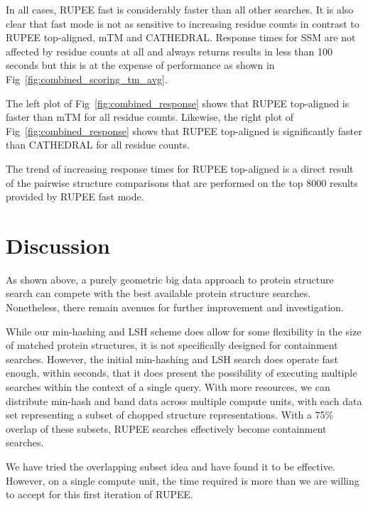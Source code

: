 \documentclass[10pt,letterpaper]{article}
\renewcommand{\figurename}{Fig}
\begin{document}
In all cases, RUPEE fast is considerably faster than all other searches. 
It is also clear that fast mode is not as sensitive to increasing residue counts in contrast to RUPEE top-aligned, mTM and CATHEDRAL.
Response times for SSM are not affected by residue counts at all and always returns results in less than 100 seconds but this is at the expense of performance as shown in \figurename~\ref{fig:combined_scoring_tm_avg}.

The left plot of \figurename~\ref{fig:combined_response} shows that RUPEE top-aligned is faster than mTM for all residue counts. 
Likewise, the right plot of \figurename~\ref{fig:combined_response} shows that RUPEE top-aligned is significantly faster than CATHEDRAL for all residue counts. 

The trend of increasing response times for RUPEE top-aligned is a direct result of the pairwise structure comparisons that are performed on the top 8000 results provided by RUPEE fast mode.

\section*{Discussion}

As shown above, a purely geometric big data approach to protein structure search can compete with the best available protein structure searches.
Nonetheless, there remain avenues for further improvement and investigation. 

While our min-hashing and LSH scheme does allow for some flexibility in the size of matched protein structures, it is not specifically designed for containment searches. 
However, the initial min-hashing and LSH search does operate fast enough, within seconds, that it does present the possibility of executing multiple searches within the context of a single query. 
With more resources, we can distribute min-hash and band data across multiple compute units, with each data set representing a subset of chopped structure representations. 
With a 75\% overlap of these subsets, RUPEE searches effectively become containment searches. 

We have tried the overlapping subset idea and have found it to be effective. 
However, on a single compute unit, the time required is more than we are willing to accept for this first iteration of RUPEE. 
\end{document}
